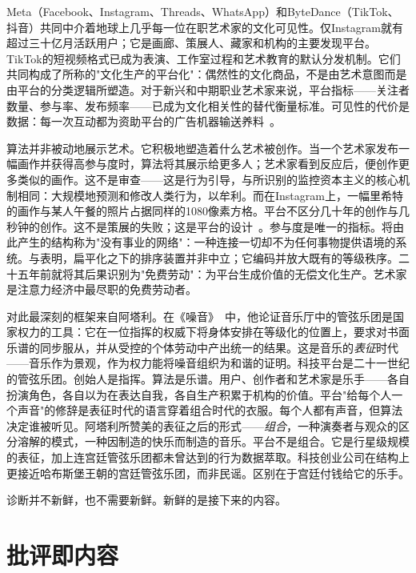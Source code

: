 \documentclass[10pt,letterpaper,twocolumn]{article}
\begin{document}
Meta（Facebook、Instagram、Threads、WhatsApp）和ByteDance（TikTok、抖音）共同中介着地球上几乎每一位在职艺术家的文化可见性。仅Instagram就有超过三十亿月活跃用户；它是画廊、策展人、藏家和机构的主要发现平台。TikTok的短视频格式已成为表演、工作室过程和艺术教育的默认分发机制。它们共同构成了\citet{nieborg2018platformization}所称的"文化生产的平台化"：偶然性的文化商品，不是由艺术意图而是由平台的分类逻辑所塑造。对于新兴和中期职业艺术家来说，平台指标——关注者数量、参与率、发布频率——已成为文化相关性的替代衡量标准。可见性的代价是数据：每一次互动都为资助平台的广告机器输送养料~\citep{zuboff2019surveillance, srnicek2017platform}。

算法并非被动地展示艺术。它积极地塑造着什么艺术被创作。当一个艺术家发布一幅画作并获得高参与度时，算法将其展示给更多人；艺术家看到反应后，便创作更多类似的画作。这不是审查——这是行为引导，与\citet{zuboff2019surveillance}所识别的监控资本主义的核心机制相同：大规模地预测和修改人类行为，以牟利。而在Instagram上，一幅里希特的画作与某人午餐的照片占据同样的1080像素方格。平台不区分几十年的创作与几秒钟的创作。这不是策展的失败；这是平台的设计~\citep{chun2016updating}。参与度是唯一的指标。\citet{lovink2011networks}将由此产生的结构称为"没有事业的网络"：一种连接一切却不为任何事物提供语境的系统。\citet{noble2018algorithms}与\citet{benjamin2019race}表明，扁平化之下的排序装置并非中立；它编码并放大既有的等级秩序。\citet{terranova2000free}二十五年前就将其后果识别为"免费劳动"：为平台生成价值的无偿文化生产。艺术家是注意力经济中最尽职的免费劳动者。

对此最深刻的框架来自阿塔利。在《噪音》~\citep{attali1985noise}中，他论证音乐厅中的管弦乐团是国家权力的工具：它在一位指挥的权威下将身体安排在等级化的位置上，要求对书面乐谱的同步服从，并从受控的个体劳动中产出统一的结果。这是音乐的\emph{表征}时代——音乐作为景观，作为权力能将噪音组织为和谐的证明。科技平台是二十一世纪的管弦乐团。创始人是指挥。算法是乐谱。用户、创作者和艺术家是乐手——各自扮演角色，各自以为在表达自我，各自生产积累于机构的价值。平台"给每个人一个声音"的修辞是表征时代的语言穿着组合时代的衣服。每个人都有声音，但算法决定谁被听见。阿塔利所赞美的表征之后的形式——\emph{组合}，一种演奏者与观众的区分溶解的模式，一种因制造的快乐而制造的音乐。平台不是组合。它是行星级规模的表征，加上连宫廷管弦乐团都未曾达到的行为数据萃取。科技创业公司在结构上更接近哈布斯堡王朝的宫廷管弦乐团，而非民谣。区别在于宫廷付钱给它的乐手。

诊断并不新鲜，也不需要新鲜。新鲜的是接下来的内容。

\section{批评即内容}
\end{document}
